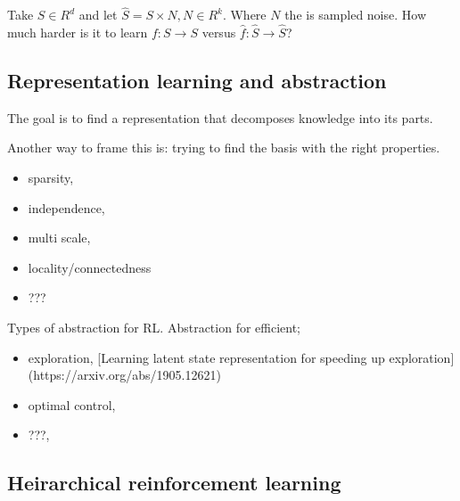 Take \(S \in R^d\) and let \(\hat S = S \times N, N \in R^k\). Where
\(N\) the is sampled noise. How much harder is it to learn
\(f: S \to S\) versus \(\hat f: \hat S \to \hat S\)?

\cite{Wang2019a,Kaiser2019}

\hypertarget{representation-learning-and-abstraction}{%
\subsection{Representation learning and abstraction}\label{representation-learning-and-abstraction}}

The goal is to find a representation that decomposes knowledge into its
parts.

Another way to frame this is: trying to find the basis with the right
properties.

\begin{itemize}
\tightlist
\item
  sparsity,
\item
  independence,
\item
  multi scale,
\item
  locality/connectedness
\item
  ???
\end{itemize}


Types of abstraction for RL. Abstraction for efficient;

\begin{itemize}
\tightlist
\item
  exploration, [Learning latent state representation for speeding up exploration](https://arxiv.org/abs/1905.12621)
\item
  optimal control,
\item
  ???,
\end{itemize}


\subsection{Heirarchical reinforcement learning}
